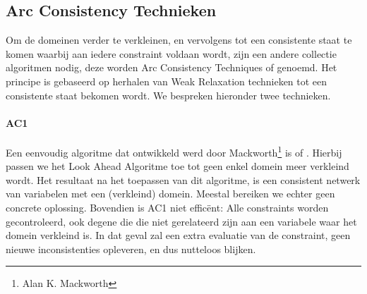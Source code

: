 \subsection{Arc Consistency Technieken}
Om de domeinen verder te verkleinen, en vervolgens tot een consistente staat te komen waarbij aan iedere constraint voldaan wordt, zijn een andere collectie algoritmen nodig, deze worden Arc Consistency Techniques of  genoemd. Het principe is gebaseerd op herhalen van Weak Relaxation technieken tot een consistente staat bekomen wordt. We bespreken hieronder twee technieken.
\paragraph{AC1} Een eenvoudig algoritme dat ontwikkeld werd door Mackworth\footnote{Alan K. Mackworth} is  of . Hierbij passen we het Look Ahead Algoritme toe tot geen enkel domein meer verkleind wordt. Het resultaat na het toepassen van dit algoritme, is een consistent netwerk van variabelen met een (verkleind) domein. Meestal bereiken we echter geen concrete oplossing. Bovendien is AC1 niet effic\"ent: Alle constraints worden gecontroleerd, ook degene die die niet gerelateerd zijn aan een variabele waar het domein verkleind is. In dat geval zal een extra evaluatie van de constraint, geen nieuwe inconsistenties opleveren, en dus nutteloos blijken.

